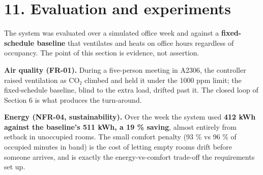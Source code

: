 \documentclass[
  11pt,
]{article}
\begin{document}
\hypertarget{evaluation-and-experiments}{%
\section{11. Evaluation and
experiments}\label{evaluation-and-experiments}}

The system was evaluated over a simulated office week and against a
\textbf{fixed-schedule baseline} that ventilates and heats on office
hours regardless of occupancy. The point of this section is evidence,
not assertion.

\textbf{Air quality (FR-01).} During a five-person meeting in A2306, the controller raised ventilation as CO₂ climbed and held it under the 1000
ppm limit; the fixed-schedule baseline, blind to the extra load, drifted
past it. The closed loop of Section 6 is what produces the turn-around.

\begin{center}
\end{center}

\textbf{Energy (NFR-04, sustainability).} Over the week the system used
\textbf{412 kWh against the baseline's 511 kWh, a 19 \% saving}, almost entirely from setback in unoccupied rooms. The small comfort
penalty (93 \% vs 96 \% of occupied minutes in band) is the cost of
letting empty rooms drift before someone arrives, and is exactly the
energy-vs-comfort trade-off the requirements set up.

\begin{center}
\end{center}
\end{document}
